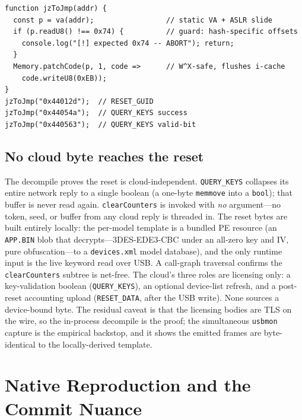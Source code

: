 \documentclass[conference]{IEEEtran}
\begin{document}
\begin{lstlisting}[language=PyFrida,caption={Forcing a licensing gate
taken: \texttt{JZ}$\rightarrow$\texttt{JMP} (\texttt{0x74}$\rightarrow$\texttt{0xEB}),
displacement preserved.},label={lst:frida}]
function jzToJmp(addr) {
  const p = va(addr);                 // static VA + ASLR slide
  if (p.readU8() !== 0x74) {          // guard: hash-specific offsets
    console.log("[!] expected 0x74 -- ABORT"); return;
  }
  Memory.patchCode(p, 1, code =>      // W^X-safe, flushes i-cache
    code.writeU8(0xEB));
}
jzToJmp("0x44012d");  // RESET_GUID
jzToJmp("0x44054a");  // QUERY_KEYS success
jzToJmp("0x440563");  // QUERY_KEYS valid-bit
\end{lstlisting}

\subsection{No cloud byte reaches the reset}
\label{sec:drm-independence}

The decompile proves the reset is cloud-independent. \texttt{QUERY\_KEYS}
collapses its entire network reply to a single boolean (a one-byte
\texttt{memmove} into a \texttt{bool}); that buffer is never read again.
\texttt{clearCounters} is invoked with \emph{no} argument---no token,
seed, or buffer from any cloud reply is threaded in. The reset bytes are
built entirely locally: the per-model template is a bundled PE resource
(an \texttt{APP.BIN} blob that decrypts---3DES-EDE3-CBC under an all-zero
key and IV, pure obfuscation---to a \texttt{devices.xml} model database),
and the only runtime input is the live keyword read over USB. A
call-graph traversal confirms the \texttt{clearCounters} subtree is
net-free. The cloud's three roles are licensing only: a key-validation
boolean (\texttt{QUERY\_KEYS}), an optional device-list refresh, and a
post-reset accounting upload (\texttt{RESET\_DATA}, after the USB write).
None sources a device-bound byte. The residual caveat is that the
licensing bodies are TLS on the wire, so the in-process decompile is the
proof; the simultaneous \texttt{usbmon} capture is the empirical
backstop, and it shows the emitted frames are byte-identical to the
locally-derived template.

\section{Native Reproduction and the Commit Nuance}
\label{sec:native}
\end{document}
